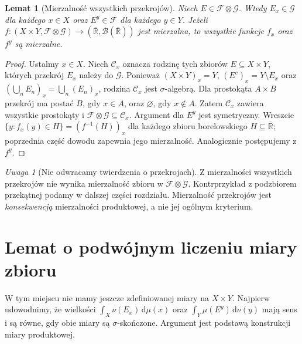 \documentclass[11pt,a4paper,oneside]{book}
\numberwithin{equation}{chapter}
\theoremstyle{plain}
\newtheorem{lemat}[twierdzenie]{Lemat}
\theoremstyle{definition}
\theoremstyle{remark}
\newtheorem{uwaga}[twierdzenie]{Uwaga}
\begin{document}
\begin{lemat}[Mierzalność wszystkich przekrojów]
\label{lem:sections-measurable-12}
Niech $E\in\mathcal F\otimes\mathcal G$.
Wtedy $E_x\in\mathcal G$ dla każdego $x\in X$
oraz $E^y\in\mathcal F$ dla każdego $y\in Y$.
Jeżeli $f:(X\times Y,\mathcal F\otimes\mathcal G)
\to(\overline{\mathbb R},\mathcal B(\overline{\mathbb R}))$
jest mierzalna, to wszystkie funkcje $f_x$ oraz $f^y$
są mierzalne.
\end{lemat}
\begin{proof}
Ustalmy $x\in X$. Niech $\mathcal C_x$ oznacza rodzinę
tych zbiorów $E\subseteq X\times Y$, których przekrój
$E_x$ należy do $\mathcal G$. Ponieważ
$(X\times Y)_x=Y$, $(E^c)_x=Y\setminus E_x$ oraz
$(\bigcup_nE_n)_x=\bigcup_n(E_n)_x$, rodzina
$\mathcal C_x$ jest $\sigma$-algebrą. Dla prostokąta
$A\times B$ przekrój ma postać $B$, gdy $x\in A$,
oraz $\varnothing$, gdy $x\notin A$. Zatem
$\mathcal C_x$ zawiera wszystkie prostokąty i
$\mathcal F\otimes\mathcal G\subseteq\mathcal C_x$.
Argument dla $E^y$ jest symetryczny. Wreszcie
$\{y:f_x(y)\in H\}=(f^{-1}(H))_x$ dla każdego
zbioru borelowskiego $H\subseteq\overline{\mathbb R}$;
poprzednia część dowodu zapewnia jego mierzalność.
Analogicznie postępujemy z $f^y$.
\end{proof}

\begin{uwaga}[Nie odwracamy twierdzenia o przekrojach]
Z mierzalności wszystkich przekrojów nie wynika
mierzalność zbioru w $\mathcal F\otimes\mathcal G$.
Kontrprzykład z podzbiorem przekątnej podamy w dalszej
części rozdziału. Mierzalność przekrojów jest
\emph{konsekwencją} mierzalności produktowej, a nie
jej ogólnym kryterium.
\end{uwaga}

\section{Lemat o podwójnym liczeniu miary zbioru}

W tym miejscu nie mamy jeszcze zdefiniowanej miary na
$X\times Y$. Najpierw udowodnimy, że wielkości
$\int_X\nu(E_x)\,\mathrm d\mu(x)$ oraz
$\int_Y\mu(E^y)\,\mathrm d\nu(y)$ mają sens
i są równe, gdy obie miary są $\sigma$-skończone.
Argument jest podstawą konstrukcji miary produktowej.
\end{document}
